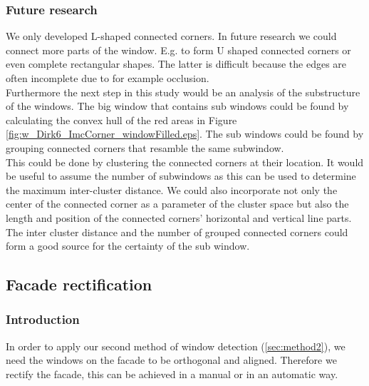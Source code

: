 \subsubsection{Future research} %
We only developed L-shaped connected corners. In future research we could
connect more parts of the window. E.g. to form U shaped connected corners or
even complete rectangular shapes. The latter is difficult because the edges are
often incomplete due to for example occlusion.\\

Furthermore the next step in this study would be an analysis of the substructure
of the windows.  The big window that contains sub windows could be
found by calculating the convex hull of the red areas in Figure
\ref{fig:w_Dirk6_ImcCorner_windowFilled.eps}.  The sub windows could be found
by grouping connected corners that resamble the same subwindow.\\

This could be done by clustering the connected corners at their location.
It would be useful to assume the number of subwindows as this can be used to
determine the maximum inter-cluster distance.  
We could also incorporate not only the center of the connected corner as a
parameter of the cluster space but also the length and position of the
connected corners' horizontal and vertical line parts.  The inter cluster
distance and the number of grouped connected corners could form a good source for
the certainty of the sub window.\\







\subsection{Facade rectification}
\subsubsection{Introduction}
In order to apply our second method of window detection (\ref{sec:method2}),
we need the windows on the facade to be orthogonal and aligned.
Therefore we rectify the facade, this can be achieved in a manual or in an automatic way.\\

